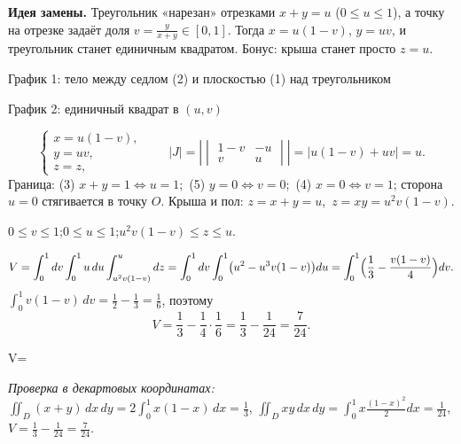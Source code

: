 \textbf{Идея замены.} Треугольник «нарезан» отрезками $x+y=u$ ($0\leqslant u\leqslant1$), а точку на отрезке задаёт доля $v=\frac{y}{x+y}\in[0,1]$. Тогда $x=u(1-v)$, $y=uv$, и треугольник станет единичным квадратом. Бонус: крыша станет просто $z=u$.

\begin{center}
\begin{minipage}[t]{0.49\linewidth}\centering
\figTen

\small График 1: тело между седлом (2) и плоскостью (1) над треугольником
\end{minipage}\hfill
\begin{minipage}[t]{0.49\linewidth}\centering
{}

\small График 2: единичный квадрат в $(u,v)$
\end{minipage}
\end{center}

\[
\begin{cases}x=u(1-v),\\ y=uv,\\ z=z,\end{cases}
\qquad
|J|=\left|\begin{vmatrix}1-v&-u\\ v&u\end{vmatrix}\right|=|u(1-v)+uv|=u .
\]
Граница: (3) $x+y=1\iff u=1$;\ (5) $y=0\iff v=0$;\ (4) $x=0\iff v=1$; сторона $u=0$ стягивается в точку $O$. Крыша и пол: $z=x+y=u$,\ $z=xy=u^2v(1-v)$.

$0\leqslant v\leqslant1$;\quad $0\leqslant u\leqslant1$;\quad $u^2v(1-v)\leqslant z\leqslant u$.

\[
V=\int_0^1dv\int_0^1u\,du\int_{u^2v(1-v)}^{u}dz=\int_0^1dv\int_0^1\bigl(u^2-u^3v(1-v)\bigr)du=\int_0^1\Bigl(\frac13-\frac{v(1-v)}{4}\Bigr)dv .
\]
$\int_0^1v(1-v)\,dv=\frac12-\frac13=\frac16$, поэтому
\[
V=\frac13-\frac14\cdot\frac16=\frac13-\frac1{24}=\frac{7}{24}.
\]

\begin{answerbox}
V=
\end{answerbox}

\emph{Проверка в декартовых координатах:} $\iint_D(x+y)\,dx\,dy=2\int_0^1x(1-x)\,dx=\frac13$, $\iint_Dxy\,dx\,dy=\int_0^1x\frac{(1-x)^2}{2}dx=\frac1{24}$, $V=\frac13-\frac1{24}=\frac7{24}$. \checkmark

